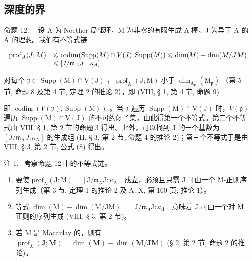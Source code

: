 \subsection{深度的界}

命题 12.--- 设 A 为 Noether 局部环，M 为非零的有限生成 A-模，J 为异于 A 的 A 的理想。我们有不等式链

\[
\begin{array}{r l} \operatorname{prof} _ {A} (J; M) & \leqslant \operatorname{codim} (\operatorname{Supp} (M) \cap V (J), \operatorname{Supp} (M)) \leqslant \dim (M) - \dim (M / J M) \\ & \leqslant [ J / \mathfrak {m} _ {A} J: \kappa_ {A} ]. \end{array}
\]

对每个 \(\mathfrak{p} \in \operatorname{Supp}(\mathrm{M})\cap \mathrm{V}(\mathrm{J})\) ，\(\operatorname{prof}_{\mathrm{A}}(\mathrm{J};\mathrm{M})\) 小于 \(\dim_{\mathrm{A}_{\mathfrak{p}}}(\mathrm{M}_{\mathfrak{p}})\) （第 5 节, 命题 8 及第 4 节, 定理 2 的推论 2），即 (VIII, § 1, 第 4 节, 命题 9)

即 \(\operatorname{codim}(V(\mathfrak{p}),\operatorname{Supp}(\mathrm{M}))\) 。当 \(\mathfrak{p}\) 遍历 \(\operatorname{Supp}(\mathrm{M}) \cap \mathrm{V}(\mathrm{J})\) 时，\(V(\mathfrak{p})\) 遍历 \(\operatorname{Supp}(\mathrm{M}) \cap \mathrm{V}(\mathrm{J})\) 的不可约闭子集，由此得第一个不等式。第二个不等式由 VIII, § 1, 第 2 节的命题 3 得出。此外，可以找到 J 的一个基数为 \([J/\mathfrak{m}_{\mathrm{A}}J:\kappa_{\mathrm{A}}]\) 的生成组 (II, § 3, 第 2 节, 命题 4 的推论 2)；第三个不等式于是由 VIII, § 3, 第 2 节, 公式 (8) 得出。

注 1.-- 考察命题 12 中的不等式链。

\begin{enumerate}
\def\labelenumi{\alph{enumi})}
\item
  要使 \(\mathrm{prof}_{\mathrm{A}}(\mathrm{J};\mathrm{M}) = [\mathrm{J} / \mathfrak{m}_{\mathrm{A}}\mathrm{J}:\kappa_{\mathrm{A}}]\) 成立，必须且只需 J 可由一个 M-正则序列生成（第 3 节, 定理 1 的推论 2 及 A, X, 第 160 页, 推论 1）。
\item
  等式 \(\dim(\mathrm{M}) - \dim(\mathrm{M}/\mathrm{JM}) = [\mathrm{J}/\mathfrak{m}_{\Lambda}\mathrm{J} : \kappa_{\Lambda}]\) 意味着 J 可由一个对 M 正则的序列生成 (VIII, § 3, 第 2 节)。
\item
  若 M 是 Macaulay 的，则有 \(\operatorname{prof}_{\mathrm{A}}(\mathbf{J};\mathbf{M}) = \dim (\mathbf{M}) - \dim (\mathbf{M} / \mathbf{JM})\) (§ 2, 第 2 节, 命题 2 的推论)。
\end{enumerate}


